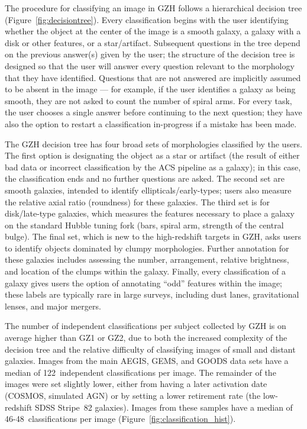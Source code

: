 \documentclass[twocolumn]{aastex6}
\begin{document}
The procedure for classifying an image in GZH follows a hierarchical decision tree (Figure~\ref{fig:decisiontree}). Every classification begins with the user identifying whether the object at the center of the image is a smooth galaxy, a galaxy with a disk or other features, or a star/artifact. Subsequent questions in the tree depend on the previous answer(s) given by the user; the structure of the decision tree is designed so that the user will answer every question relevant to the morphology that they have identified. Questions that are not answered are implicitly assumed to be absent in the image --- for example, if the user identifies a galaxy as being smooth, they are not asked to count the number of spiral arms. For every task, the user chooses a single answer before continuing to the next question; they have also the option to restart a classification in-progress if a mistake has been made. 

The GZH decision tree has four broad sets of morphologies classified by the users. The first option is designating the object as a star or artifact (the result of either bad data or incorrect classification by the ACS pipeline as a galaxy); in this case, the classification ends and no further questions are asked. The second set are smooth galaxies, intended to identify ellipticals/early-types; users also measure the relative axial ratio (roundness) for these galaxies. The third set is for disk/late-type galaxies, which measures the features necessary to place a galaxy on the standard Hubble tuning fork (bars, spiral arm, strength of the central bulge). The final set, which is new to the high-redshift targets in GZH, asks users to identify objects dominated by clumpy morphologies. Further annotation for these galaxies includes assessing the number, arrangement, relative brightness, and location of the clumps within the galaxy. Finally, every classification of a galaxy gives users the option of annotating ``odd'' features within the image; these labels are typically rare in large surveys, including dust lanes, gravitational lenses, and major mergers. 

The number of independent classifications per subject collected by GZH is on average higher than GZ1 or GZ2, due to both the increased complexity of the decision tree and the relative difficulty of classifying images of small and distant galaxies. Images from the main AEGIS, GEMS, and GOODS data sets have a median of 122~independent classifications per image. The remainder of the images were set slightly lower, either from having a later activation date (COSMOS, simulated AGN) or by setting a lower retirement rate (the low-redshift SDSS Stripe~82 galaxies). Images from these samples have a median of 46-48~classifications per image (Figure~\ref{fig:classification_hist}).
\end{document}
